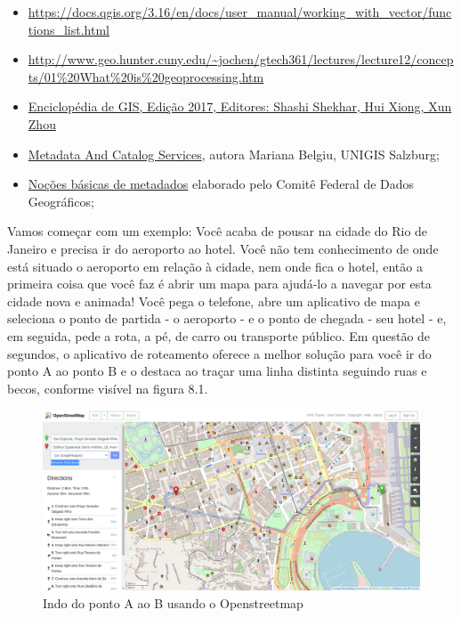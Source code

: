 \documentclass[
]{krantz}
\providecommand{\tightlist}{%
  \setlength{\itemsep}{0pt}\setlength{\parskip}{0pt}}
\begin{document}
\begin{itemize}
\tightlist
\item
  \href{https://docs.qgis.org/3.16/en/docs/user_manual/\%20working_with_vector/functions_list.html}{https://docs.qgis.org/3.16/en/docs/user\_manual/working\_with\_vector/functions\_list.html}
\item
  \href{http://www.\%20geo.hunter.cuny.edu/~jochen/gtech361/lectures/lecture12/concepts/01\%20What\%20is\%20geoprocessing.htm}{http://www.geo.hunter.cuny.edu/\textasciitilde jochen/gtech361/lectures/lecture12/concepts/01\%20What\%20is\%20geoprocessing.htm}
\item
  \href{https://link.springer.com/referencework/10.1007/978-3-319-17885-1}{Enciclopédia de GIS, Edição 2017, Editores: Shashi Shekhar, Hui Xiong, Xun Zhou}{ }
\item
  \href{https://www.geo-train.eu/modules/metadata/pdf/Metadata.pdf}{Metadata And Catalog Services}, autora Mariana Belgiu, UNIGIS Salzburg;
\item
  \href{https://www.fgdc.gov/resources/factsheets/documents/GeospatialMetadata-July2011.pdf}{Noções básicas de metadados} elaborado pelo Comitê Federal de Dados Geográficos;
\end{itemize}

Vamos começar com um exemplo: Você acaba de pousar na cidade do Rio de Janeiro e precisa ir do aeroporto ao hotel. Você não tem conhecimento de onde está situado o aeroporto em relação à cidade, nem onde fica o hotel, então a primeira coisa que você faz é abrir um mapa para ajudá-lo a navegar por esta cidade nova e animada! Você pega o telefone, abre um aplicativo de mapa e seleciona o ponto de partida - o aeroporto - e o ponto de chegada - seu hotel - e, em seguida, pede a rota, a pé, de carro ou transporte público. Em questão de segundos, o aplicativo de roteamento oferece a melhor solução para você ir do ponto A ao ponto B e o destaca ao traçar uma linha distinta seguindo ruas e becos, conforme visível na figura 8.1.

\begin{figure}
\centering
\includegraphics{media/modulo8/fig81.png}
\caption{Indo do ponto A ao B usando o Openstreetmap}
\end{figure}
\end{document}
